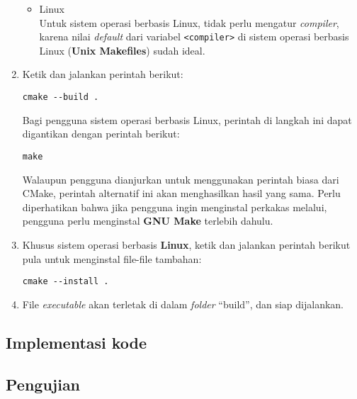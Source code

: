 \begin{enumerate}
\begin{itemize}
		\item Linux \\
		Untuk sistem operasi berbasis Linux, tidak perlu mengatur \textit{compiler}, karena nilai \textit{default} dari variabel \verb|<compiler>| di sistem operasi berbasis Linux (\textbf{Unix Makefiles}) sudah ideal.
	\end{itemize}
	
	\item Ketik dan jalankan perintah berikut:
	\begin{verbatim}
cmake --build .
	\end{verbatim}
	Bagi pengguna sistem operasi berbasis Linux, perintah di langkah ini dapat digantikan dengan perintah berikut:
	\begin{verbatim}
make
	\end{verbatim}
	Walaupun pengguna dianjurkan untuk menggunakan perintah biasa dari CMake, perintah alternatif ini akan menghasilkan hasil yang sama. Perlu diperhatikan bahwa jika pengguna ingin menginstal perkakas melalui, pengguna perlu menginstal \textbf{GNU Make} terlebih dahulu.
	
	\item Khusus sistem operasi berbasis \textbf{Linux}, ketik dan jalankan perintah berikut pula untuk menginstal file-file tambahan:
		\begin{verbatim}
cmake --install .
	\end{verbatim}
	\item File \textit{executable} akan terletak di dalam \textit{folder} ``build'', dan siap dijalankan.
\end{enumerate}

\subsection{Implementasi kode}
\label{sec:testing-implementation-code}

\subsection{Pengujian}
\label{sec:testing-experiments}